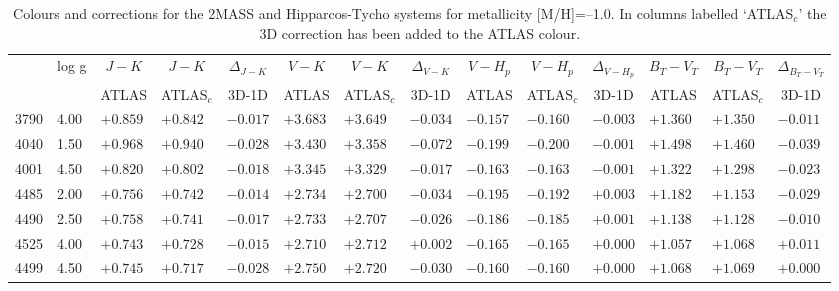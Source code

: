 \documentclass[]{aa}
\def\teff{$T\rm_{eff}$}
\begin{document}
\begin{appendix}
\begin{table*}
\caption{\label{2masshipm10}
Colours and corrections for the 2MASS and Hipparcos-Tycho systems for metallicity [M/H]=--1.0. In columns labelled `ATLAS$_c$' the 3D correction
has been added to the ATLAS colour. }
\renewcommand{\tabcolsep}{3pt}
\tabskip=0pt
\begin{center}
\begin{tabular}{llllllllllllll}
\hline\noalign{\smallskip}
\multicolumn{1}{c}{\teff} & 
\multicolumn{1}{c}{log g} & 
\multicolumn{1}{c}{$J-K$} &
\multicolumn{1}{c}{$J-K$} &
\multicolumn{1}{c}{$\Delta_{J-K}$} &
\multicolumn{1}{c}{$V-K$} &
\multicolumn{1}{c}{$V-K$} &
\multicolumn{1}{c}{$\Delta_{V-K}$} &
\multicolumn{1}{c}{$V-H_p$} &
\multicolumn{1}{c}{$V-H_p$} &
\multicolumn{1}{c}{$\Delta_{V-H_p}$} &
\multicolumn{1}{c}{$B_T-V_T$} &
\multicolumn{1}{c}{$B_T-V_T$} &
\multicolumn{1}{c}{$\Delta_{B_T-V_T}$} \\
\multicolumn{2}{c}{ } &  
\multicolumn{1}{c}{ATLAS} &
\multicolumn{1}{c}{ATLAS$_c$}&
\multicolumn{1}{c}{3D-1D}&
\multicolumn{1}{c}{ATLAS} &
\multicolumn{1}{c}{ATLAS$_c$}&
\multicolumn{1}{c}{3D-1D}&
\multicolumn{1}{c}{ATLAS} &
\multicolumn{1}{c}{ATLAS$_c$}&
\multicolumn{1}{c}{3D-1D}&
\multicolumn{1}{c}{ATLAS} &
\multicolumn{1}{c}{ATLAS$_c$}&
\multicolumn{1}{c}{3D-1D} \\
\hline\noalign{\smallskip}
\hline\noalign{\smallskip}
3790  &4.00&  $+0.859$ &$ +0.842$ &$ -0.017$ &$ +3.683$ &$ +3.649$ &$ -0.034$ &$ -0.157$ &$ -0.160$ &$ -0.003$ &$ +1.360$ &$ +1.350$  &$-0.011$\\
4040  &1.50&  $+0.968$ &$ +0.940$ &$ -0.028$ &$ +3.430$ &$ +3.358$ &$ -0.072$ &$ -0.199$ &$ -0.200$ &$ -0.001$ &$ +1.498$ &$ +1.460$  &$-0.039$\\
4001  &4.50&  $+0.820$ &$ +0.802$ &$ -0.018$ &$ +3.345$ &$ +3.329$ &$ -0.017$ &$ -0.163$ &$ -0.163$ &$ -0.001$ &$ +1.322$ &$ +1.298$  &$-0.023$\\
4485  &2.00&  $+0.756$ &$ +0.742$ &$ -0.014$ &$ +2.734$ &$ +2.700$ &$ -0.034$ &$ -0.195$ &$ -0.192$ &$ +0.003$ &$ +1.182$ &$ +1.153$  &$-0.029$\\
4490  &2.50&  $+0.758$ &$ +0.741$ &$ -0.017$ &$ +2.733$ &$ +2.707$ &$ -0.026$ &$ -0.186$ &$ -0.185$ &$ +0.001$ &$ +1.138$ &$ +1.128$  &$-0.010$\\
4525  &4.00&  $+0.743$ &$ +0.728$ &$ -0.015$ &$ +2.710$ &$ +2.712$ &$ +0.002$ &$ -0.165$ &$ -0.165$ &$ +0.000$ &$ +1.057$ &$ +1.068$  &$+0.011$\\
4499  &4.50&  $+0.745$ &$ +0.717$ &$ -0.028$ &$ +2.750$ &$ +2.720$ &$ -0.030$ &$ -0.160$ &$ -0.160$ &$ +0.000$ &$ +1.068$ &$ +1.069$  &$+0.000$\\

\end{tabular}
\end{center}
\end{table*}
\end{appendix}
\end{document}
